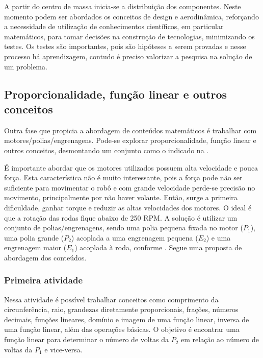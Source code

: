 \documentclass{textolivre-html}
\begin{document}
A partir do centro de massa inicia-se a distribuição dos componentes. Neste
momento podem ser abordados os conceitos de design e aerodinâmica, reforçando a
necessidade de utilização de conhecimentos científicos, em particular
matemáticos, para tomar decisões na construção de tecnologias, minimizando os
testes. Os testes são importantes, pois são hipóteses a serem provadas e nesse
processo há aprendizagem, contudo é preciso valorizar a pesquisa na solução de
um problema.


\subsection{Proporcionalidade, função linear e outros conceitos}\label{sec-proporcionalidade}
Outra fase que propicia a abordagem de conteúdos matemáticos é trabalhar com
motores/polias/engrenagens. Pode-se explorar proporcionalidade, função linear e
outros conceitos, desmontando um conjunto como o indicado na .

É importante abordar que os motores utilizados possuem alta velocidade e pouca
força. Esta característica não é muito interessante, pois a força pode não ser
suficiente para movimentar o robô e com grande velocidade perde-se precisão no
movimento, principalmente por não haver volante. Então, surge a primeira
dificuldade, ganhar torque e reduzir as altas velocidades dos motores. O ideal
é que a rotação das rodas fique abaixo de 250 RPM. A solução é utilizar um
conjunto de polias/engrenagens, sendo uma polia pequena fixada no motor ($P_1$),
uma polia grande ($P_2$) acoplada a uma engrenagem pequena ($E_2$) e uma engrenagem
maior ($E_1$) acoplada à roda, conforme . Segue uma proposta de abordagem
dos conteúdos.

\subsubsection{Primeira atividade}\label{sec-primeira-atividade}
Nessa atividade é possível trabalhar conceitos como comprimento da
circunferência, raio, grandezas diretamente proporcionais, frações, números
decimais, funções lineares, domínio e imagem de uma função linear, inversa de
uma função linear, além das operações básicas. O objetivo é encontrar uma
função linear para determinar o número de voltas da $P_2$ em relação ao número
de voltas da $P_1$ e vice-versa.
\end{document}
